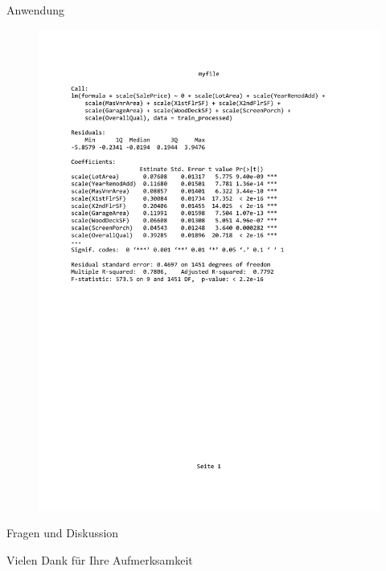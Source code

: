 \documentclass[10pt]{beamer}
\begin{document}
\begin{frame}{Anwendung}
	
	\begin{figure}
		\includegraphics[width=\textwidth, keepaspectratio]{figures/Stand_M}
	\end{figure}

	
\end{frame}	

\begin{frame}{Fragen und Diskussion}
	\begin{LARGE}
		\begin{center}
			Vielen Dank für Ihre Aufmerksamkeit
		\end{center}
	\end{LARGE}
\end{frame}
\end{document}

